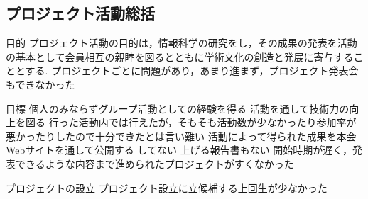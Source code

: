 \subsection*{プロジェクト活動総括}


目的
プロジェクト活動の目的は，情報科学の研究をし，その成果の発表を活動の基本として会員相互の親睦を図るとともに学術文化の創造と発展に寄与することとする.
    プロジェクトごとに問題があり，あまり進まず，プロジェクト発表会もできなかった

目標
個人のみならずグループ活動としての経験を得る
活動を通して技術力の向上を図る
    行った活動内では行えたが，そもそも活動数が少なかったり参加率が悪かったりしたので十分できたとは言い難い
活動によって得られた成果を本会Webサイトを通して公開する
    してない
    上げる報告書もない
    開始時期が遅く，発表できるような内容まで進められたプロジェクトがすくなかった

プロジェクトの設立
    プロジェクト設立に立候補する上回生が少なかった
